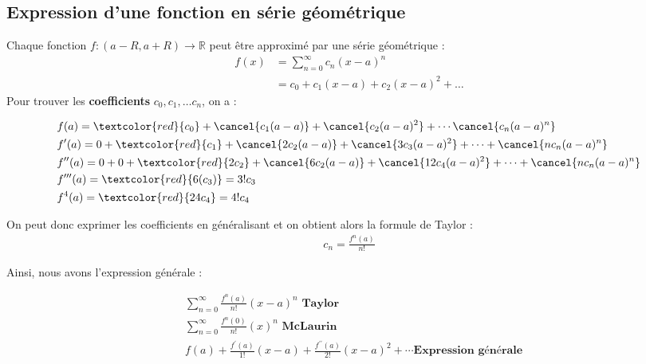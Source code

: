 \documentclass{report}
\begin{document}
\begin{multicols*}{3}
  \section{Expression d'une fonction en série géométrique}
  Chaque fonction $f : (a - R, a + R) \rightarrow \mathbb{R}$ peut être 
  approximé par une série géométrique :
  \begin{align*}
      f(x) &= \sum_{n=0}^{\infty }c_n(x - a)^n \\ 
           &= c_0 + c_1(x - a) + c_2(x - a)^2 + \dots
  \end{align*}    
  Pour trouver les \textbf{coefficients} $c_0, c_1, \dots c_n$, on a :

  \tiny{
  
  \begin{align*}
    &f(a)  = \textcolor{red}{c_0}   + 
      \cancel{c_1(a - a)} + \cancel{c_2(a - a)^2} + \cdots 
            \cancel{c_n(a - a)^n } \\ 
    &f^{\prime}(a) = 0 + \textcolor{red}{c_1} + 
          \cancel{2c_2(a - a)} + \cancel{3c_3(a - a)^2} + \cdots 
          + \cancel{nc_n(a - a)^n} \\
    &f^{\prime\prime}(a) = 0 + 0 + \textcolor{red}{2c_2} + 
          \cancel{6c_2(a - a)} + \cancel{12c_4(a - a)^2} + \cdots 
          + \cancel{nc_n(a - a)^n} \\
    &f^{\prime\prime\prime}(a) = \textcolor{red}{6(c_3)} 
                = 3!c_3 \\
    &f^{4}(a) = \textcolor{red}{24c_4} = 4!c_4  
  \end{align*}  
  }
  \noindent
  On peut donc exprimer les coefficients en généralisant et on 
  obtient 
  alors la formule de Taylor :
  \begin{align*}
        c_n =  \frac{f^{n}(a)}{n!} 
  \end{align*}

  Ainsi, nous avons l'expression générale : 
  
  \begin{align*}
      &\sum_{n=0}^{\infty } \frac{f^{n}(a)}{n!}(x - a)^n 
       \textbf{ Taylor}   
      \\ 
      &\sum_{n=0}^{\infty } \frac{f^{n}(0)}{n!}(x)^n 
       \textbf{ McLaurin}   
      \\
      &f(a) + \frac{f^{\prime}(a)}{1!}(x - a) + 
             \frac{f^{\prime\prime}(a)}{2!}(x - a)^2 + 
             \cdots \textbf{Expression générale}  
  \end{align*}    


\end{multicols*}
\end{document}
